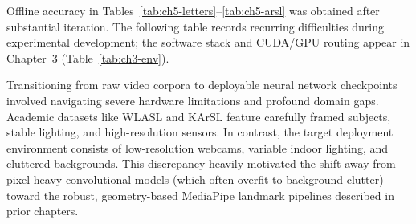 \noindent Offline accuracy in Tables~\ref{tab:ch5-letters}--\ref{tab:ch5-arsl} was obtained after substantial iteration. The following table records recurring difficulties during experimental development; the software stack and CUDA/GPU routing appear in Chapter~3 (Table~\ref{tab:ch3-env}).\par\vspace{0.3cm}

\noindent Transitioning from raw video corpora to deployable neural network checkpoints involved navigating severe hardware limitations and profound domain gaps. Academic datasets like WLASL and KArSL feature carefully framed subjects, stable lighting, and high-resolution sensors. In contrast, the target deployment environment consists of low-resolution webcams, variable indoor lighting, and cluttered backgrounds. This discrepancy heavily motivated the shift away from pixel-heavy convolutional models (which often overfit to background clutter) toward the robust, geometry-based MediaPipe landmark pipelines described in prior chapters.\par\vspace{0.3cm}

